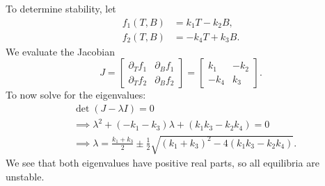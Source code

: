 \documentclass{article}
\begin{document}
To determine stability, let
%
\begin{align*}
    f_1(T, B) &= k_1 T - k_2 B, \\
    f_2(T, B) &= -k_4 T + k_3 B
    .
\end{align*}
%
We evaluate the Jacobian
%
\begin{equation*}
    J =
    \begin{bmatrix}
        \partial_T f_1 & \partial_B f_1 \\
        \partial_T f_2 & \partial_B f_2
    \end{bmatrix}
    =
    \begin{bmatrix}
        k_1 & -k_2 \\
        -k_4 & k_3
    \end{bmatrix}
    .
\end{equation*}
%
To now solve for the eigenvalues:
%
\begin{align*}
    &\det(J - \lambda I) = 0 \\
    &\implies \lambda^2 + (-k_1 - k_3) \lambda + (k_1 k_3 - k_2 k_4) = 0 \\
    &\implies \lambda = \frac{k_1 + k_3}{2} \pm \frac{1}{2} \sqrt{(k_1 + k_3)^2 - 4 (k_1 k_3 - k_2 k_4)}
    .
\end{align*}
%
We see that both eigenvalues have positive real parts, so all equilibria
are unstable.
\end{document}
